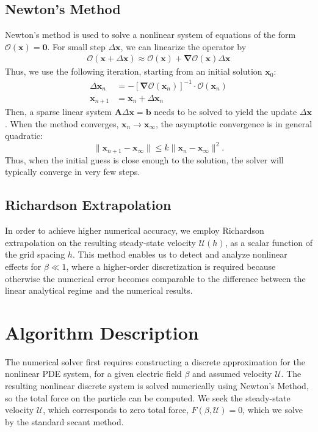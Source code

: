\documentclass[MSc,beforeExam]{iitcsthesis}
\newcommand\bnabla{\boldsymbol{\nabla}}
\newcommand\bx{\boldsymbol{x}}
\newcommand\bzero{\boldsymbol{0}}
\newcommand\cO{\mathcal{O}}
\newcommand\cU{\mathscr{U}}
\begin{document}
\subsection{Newton's Method}
Newton's method is used to solve a nonlinear system of equations of the form $\cO(\bx) = \bzero$.
For small step $\Delta\bx$, we can linearize the operator by
\begin{align}
\cO(\bx + \Delta\bx) \approx \cO(\bx) + \bnabla \cO(\bx) \Delta\bx
\end{align}
Thus, we use the following iteration, starting from an initial solution $\bx_0$:
\begin{align}
\Delta\bx_n &= - \left[\bnabla \cO(\bx_n)\right]^{-1} \cdot \cO(\bx_n) \\
\bx_{n+1} &= \bx_n + \Delta\bx_n
\end{align}
Then, a sparse linear system $\boldsymbol{A} \Delta \bx = \boldsymbol{b}$
needs to be solved to yield the update $\Delta \bx$.
When the method converges, $\bx_n \rightarrow \bx_\infty$, 
the asymptotic convergence is in general quadratic:
\begin{equation}
\|\bx_{n+1} - \bx_\infty\| \le k \|\bx_{n} - \bx_\infty\|^2.
\end{equation}
Thus, when the initial guess is close enough to the solution, the solver
will typically converge in very few steps.

\subsection{Richardson Extrapolation}
In order to achieve higher numerical accuracy, we employ Richardson extrapolation \cite{sidi2003practical}
on the resulting steady-state velocity $\cU(h)$, as a scalar function of the grid spacing $h$.
This method enables us to detect and analyze nonlinear effects for $\beta \ll 1$, where 
a higher-order discretization is required because otherwise
the numerical error becomes comparable to the difference between the linear analytical regime 
and the numerical results.

\section{Algorithm Description} \label{sec:algorithm}
The numerical solver first requires constructing a discrete 
approximation for the nonlinear PDE system,
for a given electric field $\beta$ and assumed velocity $\cU$. 
The resulting nonlinear discrete system is
solved numerically using Newton's Method, so the total force on the
particle can be computed. 
We seek the steady-state velocity $\cU$, 
which corresponds to zero total force, $F(\beta, \cU) = 0$,
which we solve by the standard secant method.
\end{document}

